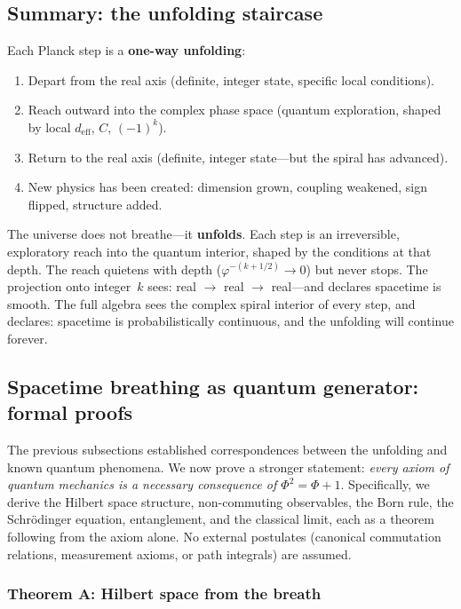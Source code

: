 \documentclass[12pt,a4paper]{article}
\begin{document}
\subsection{Summary: the unfolding staircase}

Each Planck step is a \textbf{one-way unfolding}:
\begin{enumerate}
\item Depart from the real axis (definite, integer state, specific local conditions).
\item Reach outward into the complex phase space (quantum exploration, shaped by local $d_{\mathrm{eff}}$, $C$, $(-1)^k$).
\item Return to the real axis (definite, integer state---but the spiral has advanced).
\item New physics has been created: dimension grown, coupling weakened, sign flipped, structure added.
\end{enumerate}

The universe does not breathe---it \textbf{unfolds}. Each step is an irreversible, exploratory reach into the quantum interior, shaped by the conditions at that depth. The reach quietens with depth ($\varphi^{-(k+1/2)} \to 0$) but never stops. The projection onto integer~$k$ sees: real $\to$ real $\to$ real---and declares spacetime is smooth. The full algebra sees the complex spiral interior of every step, and declares: spacetime is probabilistically continuous, and the unfolding will continue forever.

\subsection{Spacetime breathing as quantum generator: formal proofs}
\label{sec:qm-generator}

The previous subsections established correspondences between the unfolding and known quantum phenomena. We now prove a stronger statement: \emph{every axiom of quantum mechanics is a necessary consequence of $\Phi^2 = \Phi + 1$}. Specifically, we derive the Hilbert space structure, non-commuting observables, the Born rule, the Schr\"odinger equation, entanglement, and the classical limit, each as a theorem following from the axiom alone. No external postulates (canonical commutation relations, measurement axioms, or path integrals) are assumed.

\subsubsection{Theorem A: Hilbert space from the breath}
\end{document}
